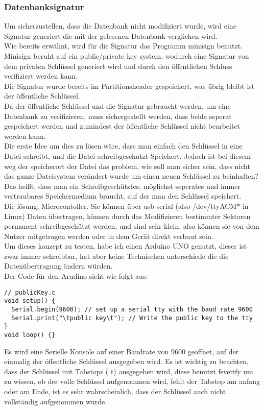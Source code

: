 \subsubsection{Datenbanksignatur}
Um sicherzustellen, dass die Datenbank nicht modifiziert wurde, wird eine Signatur generiert die mit der gelesenen Datenbank verglichen wird.\\
Wie bereits erwähnt, wird für die Signatur das Programm minisign benutzt. Minisign beruht auf ein public/private key system, wodurch eine Signatur von dem privaten Schlüssel generiert wird und durch den öffentlichen Schluss verifiziert werden kann.\\
Die Signatur wurde bereits im Partitionsheader gespeichert, was übrig bleibt ist der öffentliche Schlüssel.\\
Da der öffentliche Schlüssel und die Signatur gebraucht werden, um eine Datenbank zu verifizieren, muss sichergestellt werden, dass beide seperat gespeichert werden und zumindest der öffentliche Schlüssel nicht bearbeitet werden kann.\\
Die erste Idee um dies zu lösen wäre, dass man einfach den Schlüssel in eine Datei schreibt, und die Datei schreibgeschutzt Speichert. Jedoch ist bei diesem weg der speicherort der Datei das problem, wie soll man sicher sein, dass nicht das ganze Dateisystem verändert wurde um einen neuen Schlüssel zu beinhalten?
\bigbreak \noindent
Das heißt, dass man ein Schreibgeschütztes, möglichst seperates und immer vertraubares Speichermedium braucht, auf der man den Schlüssel speichert.\\
Die lösung: Microcontoller. Sie können über usb-serial (also /dev/ttyACM* in Linux) Daten übertragen, können durch das Modifizieren bestimmter Sektoren permanent schreibgeschützt werden, und sind sehr klein, also können sie von dem Nutzer mitgetragen werden oder in dem Gerät direkt verbaut sein.
\\
Um dieses konzept zu testen, habe ich einen Arduino UNO genutzt, dieser ist zwar immer schreibbar, hat aber keine Technischen unterschiede die die Datenübertragung ändern würden.
\\
Der Code für den Arudino sieht wie folgt aus:
\begin{verbatim}
// publicKey.c
void setup() {
  Serial.begin(9600); // set up a serial tty with the baud rate 9600
  Serial.print("\tpublic key\t"); // Write the public key to the tty
}
void loop() {}
\end{verbatim}

Es wird eine Serielle Konsole auf einer Baudrate von 9600 geöffnet, auf der einmalig der öffentliche Schlüssel ausgegeben wird. Es ist wichtig zu beachten, dass der Schlüssel mit Tabstops ( t) ausgegeben wird, diese benutzt fsverify um zu wissen, ob der volle Schlüssel aufgenommen wird, fehlt der Tabstop am anfang oder am Ende, ist es sehr wahrscheinlich, dass der Schlüssel auch nicht vollständig aufgenommen wurde.

